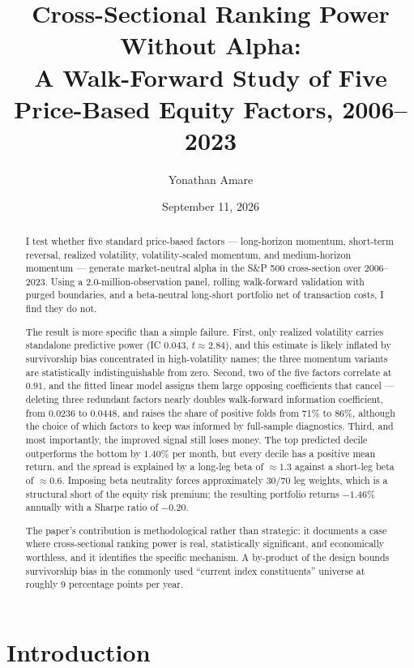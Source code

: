 \documentclass[11pt]{article}
\title{\textbf{Cross-Sectional Ranking Power Without Alpha:}\\
\large A Walk-Forward Study of Five Price-Based Equity Factors, 2006--2023}
\author{Yonathan Amare}
\date{September 11, 2026}
\begin{document}
\maketitle

\begin{abstract}
\noindent
I test whether five standard price-based factors --- long-horizon momentum,
short-term reversal, realized volatility, volatility-scaled momentum, and
medium-horizon momentum --- generate market-neutral alpha in the S\&P 500
cross-section over 2006--2023. Using a 2.0-million-observation panel, rolling
walk-forward validation with purged boundaries, and a beta-neutral long-short
portfolio net of transaction costs, I find they do not.

The result is more specific than a simple failure. First, only realized
volatility carries standalone predictive power (IC $0.043$, $t \approx 2.84$),
and this estimate is likely inflated by survivorship bias concentrated in
high-volatility names; the three momentum variants are statistically
indistinguishable from zero. Second, two of the five factors correlate at
$0.91$, and the fitted linear model assigns them large opposing coefficients
that cancel --- deleting three redundant factors nearly doubles walk-forward
information coefficient, from $0.0236$ to $0.0448$, and raises the share of
positive folds from 71\% to 86\%, although the choice of which factors to keep
was informed by full-sample diagnostics. Third, and most importantly, the
improved signal still loses money. The top predicted decile outperforms the
bottom by $1.40\%$ per month, but every decile has a positive mean return, and
the spread is explained by a long-leg beta of $\approx 1.3$ against a short-leg
beta of $\approx 0.6$. Imposing beta neutrality forces approximately $30/70$
leg weights, which is a structural short of the equity risk premium; the
resulting portfolio returns $-1.46\%$ annually with a Sharpe ratio of $-0.20$.

The paper's contribution is methodological rather than strategic: it documents
a case where cross-sectional ranking power is real, statistically significant,
and economically worthless, and it identifies the specific mechanism.
A by-product of the design bounds survivorship bias in the commonly used
``current index constituents'' universe at roughly 9 percentage points per year.
\end{abstract}

\section{Introduction}
\end{document}
